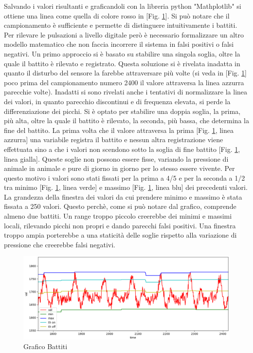 Salvando i valori risultanti e graficandoli con la libreria python "Mathplotlib" si ottiene una linea come quella di colore rosso in [Fig. \ref{fig:Heartbeat}]. Si può notare che il campionamento è sufficiente e permette di distinguere intuitivamente i battiti. 
Per rilevare le pulsazioni a livello digitale però è necessario formalizzare un altro modello matematico che non faccia incorrere il sistema in falsi positivi o falsi negativi. Un primo approccio si è basato su stabilire una singola soglia, oltre la quale il battito è rilevato e registrato. Questa soluzione si è rivelata inadatta in quanto il disturbo del sensore la farebbe attraversare più volte (si veda in [Fig. \ref{fig:Heartbeat}] poco prima del campionamento numero 2400 il valore attraversa la linea azzurra parecchie volte). Inadatti si sono rivelati anche i tentativi di normalizzare la linea dei valori, in quanto parecchio discontinui e di frequenza elevata, si perde la differenziazione dei picchi. Si è optato per stabilire una doppia soglia, la prima, più alta, oltre la quale il battito è rilevato, la seconda, più bassa, che determina la fine del battito. La prima volta che il valore attraversa la prima [Fig. \ref{fig:Heartbeat}, linea azzurra] una variabile registra il battito e nessun altra registrazione viene effettuata sino a che i valori non scendono sotto la soglia di fine battito [Fig. \ref{fig:Heartbeat}, linea gialla]. 
Queste soglie non possono essere fisse, variando la pressione di animale in animale e pure di giorno in giorno per lo stesso essere vivente. Per questo motivo i valori sono stati fissati per la prima a 4/5 e per la seconda a 1/2 tra minimo [Fig. \ref{fig:Heartbeat}, linea verde] e massimo [Fig. \ref{fig:Heartbeat}, linea blu] dei precedenti valori. La grandezza della finestra dei valori da cui prendere minimo  e massimo è stata fissata a 250 valori. Questo perchè, come si può notare dal grafico, comprende almeno due battiti. Un range troppo piccolo creerebbe dei minimi e massimi locali, rilevando picchi non propri e dando parecchi falsi positivi. Una finestra troppo ampia porterebbe a una staticità delle soglie rispetto alla variazione di pressione che creerebbe falsi negativi.  

    \begin{figure}[H]
        \caption{Grafico Battiti}
        \label{fig:Heartbeat}
        \centering
        \includegraphics[width=1\textwidth]{Images/heartbeatGraph.png}
    \end{figure}


